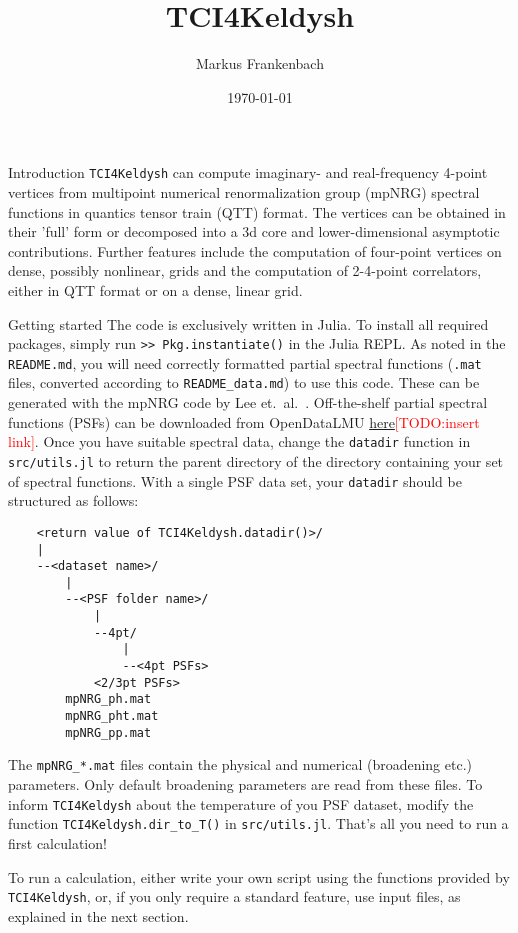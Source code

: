 \documentclass[12pt]{article}
\title{TCI4Keldysh}
\author{Markus Frankenbach}
\date{\today}
\begin{document}
\maketitle

\begin{section}{Introduction}
\texttt{TCI4Keldysh} can compute imaginary- and real-frequency 4-point vertices from multipoint numerical renormalization group (mpNRG) spectral functions in quantics tensor train (QTT) format.
The vertices can be obtained in their 'full' form or decomposed into a 3d core and lower-dimensional asymptotic contributions.
Further features include the computation of four-point vertices on dense, possibly nonlinear, grids and the computation of 2-4-point correlators, either
in QTT format or on a dense, linear grid.
\end{section}

\begin{section}{Getting started}
\label{sec:getting_started}
The code is exclusively written in Julia. To install all required packages,
simply run \texttt{>> Pkg.instantiate()} in the Julia REPL.
As noted in the \texttt{README.md}, you will need correctly formatted partial spectral functions (\texttt{.mat} files, converted according to \texttt{README\_data.md}) to use this code.
These can be generated with the mpNRG code by Lee et.~al.\ \cite{Lee2021}.
Off-the-shelf partial spectral functions (PSFs) can be downloaded from OpenDataLMU \href{https://www.google.com/}{here}\textcolor{red}{[TODO:insert link]}.
Once you have suitable spectral data, change the \texttt{datadir} function in \texttt{src/utils.jl} to
return the parent directory of the directory containing your set of spectral functions.
With a single PSF data set, your \texttt{datadir} should be structured as follows:
\begin{verbatim}
    <return value of TCI4Keldysh.datadir()>/
    |
    --<dataset name>/
        |
        --<PSF folder name>/
            |
            --4pt/
                |
                --<4pt PSFs>
            <2/3pt PSFs>
        mpNRG_ph.mat
        mpNRG_pht.mat
        mpNRG_pp.mat
\end{verbatim}
The \texttt{mpNRG\_*.mat} files contain the physical and numerical (broadening etc.) parameters.
Only default broadening parameters are read from these files.
To inform \texttt{TCI4Keldysh} about the temperature of you PSF dataset, modify the function \texttt{TCI4Keldysh.dir\_to\_T()} in \texttt{src/utils.jl}.
That's all you need to run a first calculation! 

To run a calculation, either write your own script using
the functions provided by \texttt{TCI4Keldysh}, or, if you only require a standard feature,
use input files, as explained in the next section.
\end{section}
\end{document}
